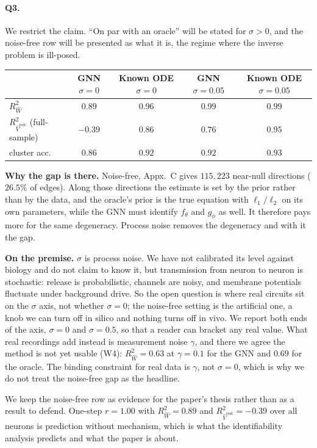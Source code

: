 
\paragraph{Q3.}
We restrict the claim. ``On par with an oracle'' will be stated for
$\sigma > 0$, and the noise-free row will be presented as what it is, the regime
where the inverse problem is ill-posed.

\begin{center}
{\footnotesize
\begin{tabular}{lcccc}
\toprule
 & GNN $\sigma = 0$ & Known ODE $\sigma = 0$ & GNN $\sigma = 0.05$ & Known ODE $\sigma = 0.05$ \\
\midrule
$R^2_{\widehat{W}}$                                & $0.89$  & $0.96$ & $0.99$ & $0.99$ \\
$R^2_{\widehat{V}^{\mathrm{rest}}}$ (full-sample)  & $-0.39$ & $0.86$ & $0.76$ & $0.95$ \\
cluster acc.                                       & $0.86$  & $0.92$ & $0.92$ & $0.93$ \\
\bottomrule
\end{tabular}}
\end{center}

\textbf{Why the gap is there.} Noise-free, Appx.~C gives $115{,}223$ near-null
directions ($26.5\%$ of edges). Along those directions the estimate is set by the
prior rather than by the data, and the oracle's prior is the true equation with
$\ell_1/\ell_2$ on its own parameters, while the GNN must identify $f_\theta$ and
$g_\phi$ as well. It therefore pays more for the same degeneracy. Process noise
removes the degeneracy and with it the gap.

\textbf{On the premise.} $\sigma$ is process noise. We have not calibrated its
level against biology and do not claim to know it, but transmission from neuron
to neuron is stochastic: release is probabilistic, channels are noisy, and
membrane potentials fluctuate under background drive. So the open question is
where real circuits sit on the $\sigma$ axis, not whether $\sigma = 0$; the
noise-free setting is the artificial one, a knob we can turn off in silico and
nothing turns off in vivo. We report both ends of the axis, $\sigma = 0$ and
$\sigma = 0.5$, so that a reader can bracket any real value. What real recordings
add instead is
measurement noise $\gamma$, and there we agree the method is not yet usable
(W4): $R^2_{\widehat{W}} = 0.63$ at $\gamma = 0.1$ for the GNN and $0.69$ for the
oracle. The binding constraint for real data is $\gamma$, not $\sigma = 0$, which
is why we do not treat the noise-free gap as the headline.

We keep the noise-free row as evidence for the paper's thesis rather than as a
result to defend. One-step $r = 1.00$ with $R^2_{\widehat{W}} = 0.89$ and
$R^2_{\widehat{V}^{\mathrm{rest}}} = -0.39$ over all neurons is prediction
without mechanism, which is what the identifiability analysis predicts and what
the paper is about.
